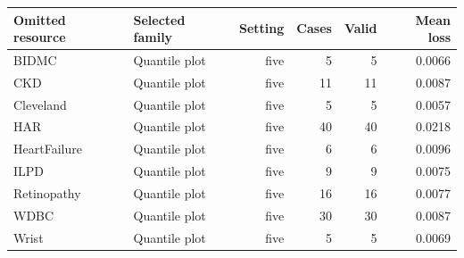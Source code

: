 \begin{tabular}{llrrrr}\toprule
Omitted resource & Selected family & Setting & Cases & Valid & Mean loss\\\midrule
BIDMC & Quantile plot & five & 5 & 5 & 0.0066\\
CKD & Quantile plot & five & 11 & 11 & 0.0087\\
Cleveland & Quantile plot & five & 5 & 5 & 0.0057\\
HAR & Quantile plot & five & 40 & 40 & 0.0218\\
HeartFailure & Quantile plot & five & 6 & 6 & 0.0096\\
ILPD & Quantile plot & five & 9 & 9 & 0.0075\\
Retinopathy & Quantile plot & five & 16 & 16 & 0.0077\\
WDBC & Quantile plot & five & 30 & 30 & 0.0087\\
Wrist & Quantile plot & five & 5 & 5 & 0.0069\\
\bottomrule\end{tabular}
